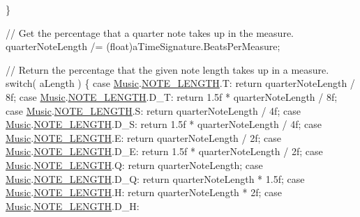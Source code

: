 \begin{DoxyCodeInclude}
        \}

        \textcolor{comment}{// Get the percentage that a quarter note takes up in the measure.}
        quarterNoteLength /= (float)aTimeSignature.BeatsPerMeasure;

        \textcolor{comment}{// Return the percentage that the given note length takes up in a measure.}
        \textcolor{keywordflow}{switch}( aLength )
        \{
            \textcolor{keywordflow}{case} \hyperlink{class_music}{Music}.\hyperlink{group___music_enums_gaf11b5f079adbb21c800b9eca1c5c3cbd}{NOTE\_LENGTH}.T:
                \textcolor{keywordflow}{return} quarterNoteLength / 8f;
            \textcolor{keywordflow}{case} \hyperlink{class_music}{Music}.\hyperlink{group___music_enums_gaf11b5f079adbb21c800b9eca1c5c3cbd}{NOTE\_LENGTH}.D\_T:
                \textcolor{keywordflow}{return} 1.5f * quarterNoteLength / 8f;
            \textcolor{keywordflow}{case} \hyperlink{class_music}{Music}.\hyperlink{group___music_enums_gaf11b5f079adbb21c800b9eca1c5c3cbd}{NOTE\_LENGTH}.S:
                \textcolor{keywordflow}{return} quarterNoteLength / 4f;
            \textcolor{keywordflow}{case} \hyperlink{class_music}{Music}.\hyperlink{group___music_enums_gaf11b5f079adbb21c800b9eca1c5c3cbd}{NOTE\_LENGTH}.D\_S:
                \textcolor{keywordflow}{return} 1.5f * quarterNoteLength / 4f;
            \textcolor{keywordflow}{case} \hyperlink{class_music}{Music}.\hyperlink{group___music_enums_gaf11b5f079adbb21c800b9eca1c5c3cbd}{NOTE\_LENGTH}.E:
                \textcolor{keywordflow}{return} quarterNoteLength / 2f;
            \textcolor{keywordflow}{case} \hyperlink{class_music}{Music}.\hyperlink{group___music_enums_gaf11b5f079adbb21c800b9eca1c5c3cbd}{NOTE\_LENGTH}.D\_E:
                \textcolor{keywordflow}{return} 1.5f * quarterNoteLength / 2f;
            \textcolor{keywordflow}{case} \hyperlink{class_music}{Music}.\hyperlink{group___music_enums_gaf11b5f079adbb21c800b9eca1c5c3cbd}{NOTE\_LENGTH}.Q:
                \textcolor{keywordflow}{return} quarterNoteLength;
            \textcolor{keywordflow}{case} \hyperlink{class_music}{Music}.\hyperlink{group___music_enums_gaf11b5f079adbb21c800b9eca1c5c3cbd}{NOTE\_LENGTH}.D\_Q:
                \textcolor{keywordflow}{return} quarterNoteLength * 1.5f;
            \textcolor{keywordflow}{case} \hyperlink{class_music}{Music}.\hyperlink{group___music_enums_gaf11b5f079adbb21c800b9eca1c5c3cbd}{NOTE\_LENGTH}.H:
                \textcolor{keywordflow}{return} quarterNoteLength * 2f;
            \textcolor{keywordflow}{case} \hyperlink{class_music}{Music}.\hyperlink{group___music_enums_gaf11b5f079adbb21c800b9eca1c5c3cbd}{NOTE\_LENGTH}.D\_H:

\end{DoxyCodeInclude}
